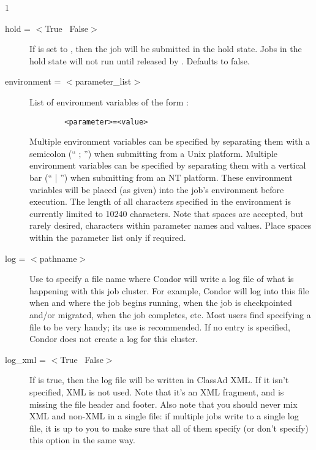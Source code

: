 \begin{ManPage}{\label{man-condor-submit}}{1}
\begin{description}

\item[hold = $<$True \Bar\ False$>$] If  is set to
, then the job will be submitted in the hold state.  Jobs in
the hold state will not run until released by .
Defaults to false.


\item[environment = $<$parameter\_list$>$] List of environment variables
of the form :
\begin{verbatim}
        <parameter>=<value>
\end{verbatim}
Multiple environment variables can be specified by separating them with a
semicolon (`` ; '') when submitting from a Unix platform.
Multiple environment variables can be specified by separating them with a
vertical bar (`` | '') when submitting from an NT platform.
These environment variables will be placed (as given) into the
job's environment before execution. The length of all characters
specified in the environment is currently limited to 10240 characters.  
Note that spaces are accepted, but rarely desired,
characters within parameter names and values.
Place spaces within the parameter list only if required.


\item[log = $<$pathname$>$] Use  to specify a file name where
Condor will write a log file of what is happening with this job cluster.
For example, Condor will log into this file when and where the job
begins running, when the job is checkpointed and/or migrated, when the
job completes, etc. Most users find specifying a  file to be very
handy; its use is recommended. If no  entry is specified, 
Condor does not create a log for this cluster.

\item[log\_xml = $<$True \Bar\ False$>$] If  is true, 
then the log file will be written in ClassAd XML. If it isn't
specified, XML is not used. Note that it's an XML fragment, and is
missing the file header and footer. Also note that you should never
mix XML and non-XML in a single file: if multiple jobs write to a
single log file, it is up to you to make sure that all of them specify
(or don't specify) this option in the same way.


\end{description}
\end{ManPage}
